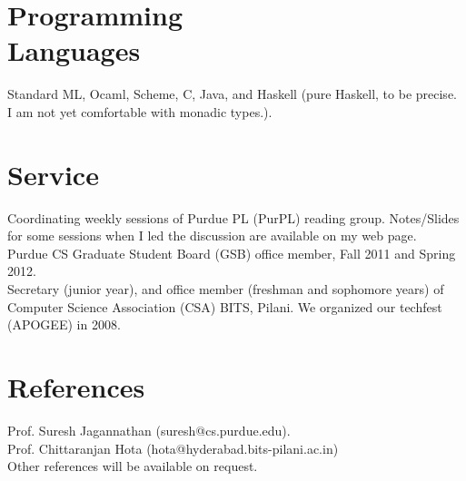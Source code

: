 \documentclass[margin,line]{res}
\begin{document}
\begin{resume}
\section{Programming \\ Languages}
Standard ML, Ocaml, Scheme, C, Java, and Haskell (pure Haskell, to be
precise. I am not yet comfortable with monadic types.).

\section {Service}
Coordinating weekly sessions of Purdue PL (PurPL) reading group.
Notes/Slides for some sessions when I led the discussion are available
on my web page.\\
Purdue CS Graduate Student Board (GSB) office member, Fall 2011 and
Spring 2012.\\
Secretary (junior year), and office member (freshman and sophomore
years) of Computer Science Association (CSA) BITS, Pilani. We
organized our techfest (APOGEE) in 2008. \\

\section{References}
Prof. Suresh Jagannathan (suresh@cs.purdue.edu).\\
Prof. Chittaranjan Hota (hota@hyderabad.bits-pilani.ac.in)\\
Other references will be available on request.
\end{resume} 
\end{document}
